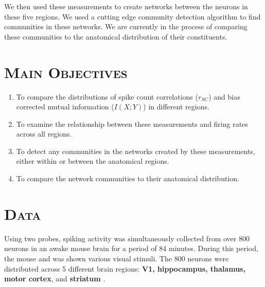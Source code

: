 \documentclass[a0,portrait]{a0poster}
\begin{document}
\begin{multicols}{2}
We then used these measurements to create networks between the neurons in these five regions. We used a cutting edge community detection algorithm to find communities in these networks. We are currently in the process of comparing these communities to the anatomical distribution of their constituents.



\section*{\color{NavyBlue}\textsc{Main Objectives}\color{NavyBlue}}

\begin{enumerate}
  \item To compare the distributions of spike count correlations ($r_{SC}$) and bias corrected mutual information ($I(X;Y)$) in different regions.
  \item To examine the relationship between these measurements and firing rates across all regions.
  \item To detect any communities in the networks created by these measurements, either within or between the anatomical regions.
  \item To compare the network communities to their anatomical distribution.
\end{enumerate}


\section*{\color{NavyBlue}\textsc{Data}\color{NavyBlue}}

Using two probes, spiking activity was simultaneously collected from over 800 neurons in an awake mouse brain for a period of 84 minutes. During this period, the mouse and was shown various visual stimuli. The 800 neurons were distributed across 5 different brain regions: \textbf{V1, hippocampus, thalamus, motor cortex}, and \textbf{striatum} \cite{jun}.


\end{multicols}
\end{document}

